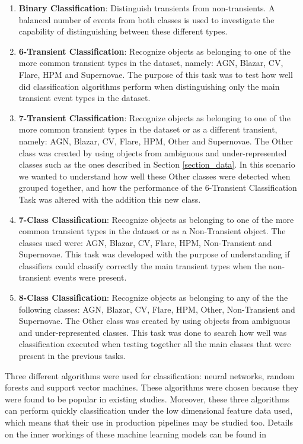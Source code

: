 \begin{enumerate}
    \item \textbf{Binary Classification}: 
    Distinguish transients from non-transients. A balanced number of events from both classes is used to investigate the capability of distinguishing between these different types.
    \item \textbf{6-Transient Classification}: Recognize objects as belonging to one of the more common transient types in the dataset, namely: AGN, Blazar, CV, Flare, HPM and Supernovae. The purpose of this task was to test how well did classification algorithms perform when distinguishing only the main transient event types in the dataset.
    \item \textbf{7-Transient Classification}: Recognize objects as belonging to one of the more common transient types in the dataset or as a different transient, namely: AGN, Blazar, CV, Flare, HPM, Other and Supernovae. The Other class was created by using objects from ambiguous and under-represented classes such as the ones described in Section \ref{section_data}. In this scenario we wanted to understand how well these Other classes were detected when grouped together, and how the performance of the 6-Transient Classification Task was altered with the addition this new class.
    \item \textbf{7-Class Classification}: Recognize objects as belonging to one of the more common transient types in the dataset or as a Non-Transient object. The classes used were: AGN, Blazar, CV, Flare, HPM, Non-Transient and Supernovae. This task was developed with the purpose of understanding if classifiers could classify correctly the main transient types when the non-transient events were present.
    \item \textbf{8-Class Classification}: Recognize objects as belonging to any of the the following classes: AGN, Blazar, CV, Flare, HPM, Other, Non-Transient and Supernovae. The Other class was created by using objects from ambiguous and under-represented classes. This task was done to search how well was classification executed when testing together all the main classes that were present in the previous tasks.
\end{enumerate}

Three different algorithms were used for classification: neural networks, random forests and support vector machines. These algorithms were chosen because they were found to be popular in existing studies. Moreover, these three algorithms can perform quickly classification under the low dimensional feature data used, which means that their use in production pipelines may be studied too. Details on the inner workings of these machine learning models can be found in \cite{9780387848570}

